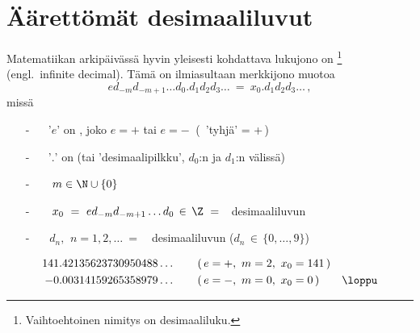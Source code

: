 \section{Äärettömät desimaaliluvut} \label{desimaaliluvut}
\alku
{}

Matematiikan arkipäivässä hyvin yleisesti kohdattava lukujono on
\footnote[2]{Vaihtoehtoinen nimitys on 
desimaaliluku. } (engl.\ infinite decimal). Tämä on
ilmiasultaan merkkijono muotoa
\[
e d_{-m} d_{-m+1} \ldots d_0 . d_1 d_2 d_3 \ldots\ =\ x_0.d_1 d_2 d_3 \ldots\,,
\]
missä
\begin{itemize}
\item[-] $\quad$ '$e$' on , joko $e = +$ tai $e = -\ $ (\ 'tyhjä' = +\,)
\item[-] $\quad$ '$.$' on  
                           (tai 'desimaalipilkku', $d_0$:n ja $d_1$:n välissä)
\item[-] $\quad \ \ m\in\N\cup\{0\}$
\item[-] $\quad \ \ x_0\ =\ e d_{-m} d_{-m+1} \ldots d_0\,\in\,\Z\ =$\ \ desimaaliluvun 
\item[-] $\quad \ \ d_n,\,\ n=1,2,\ldots\ =$\ \ desimaaliluvun 
                    ($d_n\,\in\,\{0, \ldots, 9\}$)
\end{itemize}
\begin{Exa}
\begin{align*}
141&.42135623730950488 \ldots \qquad (\,e = +,\ m = 2,\ x_0 = 141\,) \\
- 0&.00314159265358979 \ldots \qquad (\,e = -,\ m = 0,\ x_0 =0\,) \qquad \loppu
\end{align*}
\end{Exa}

